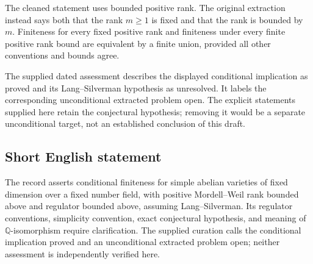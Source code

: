 \documentclass[11pt]{article}
\newcommand{\Q}{\mathbb{Q}}
\begin{document}
The cleaned statement uses bounded positive rank. The original extraction instead says both that the rank \(m\geq1\) is fixed and that the rank is bounded by \(m\). Finiteness for every fixed positive rank and finiteness under every finite positive rank bound are equivalent by a finite union, provided all other conventions and bounds agree.

The supplied dated assessment describes the displayed conditional implication as proved and its Lang--Silverman hypothesis as unresolved. It labels the corresponding unconditional extracted problem open. The explicit statements supplied here retain the conjectural hypothesis; removing it would be a separate unconditional target, not an established conclusion of this draft.
\subsection{Short English statement}
The record asserts conditional finiteness for simple abelian varieties of fixed dimension over a fixed number field, with positive Mordell--Weil rank bounded above and regulator bounded above, assuming Lang--Silverman. Its regulator conventions, simplicity convention, exact conjectural hypothesis, and meaning of \(\Q\)-isomorphism require clarification. The supplied curation calls the conditional implication proved and an unconditional extracted problem open; neither assessment is independently verified here.
\end{document}
